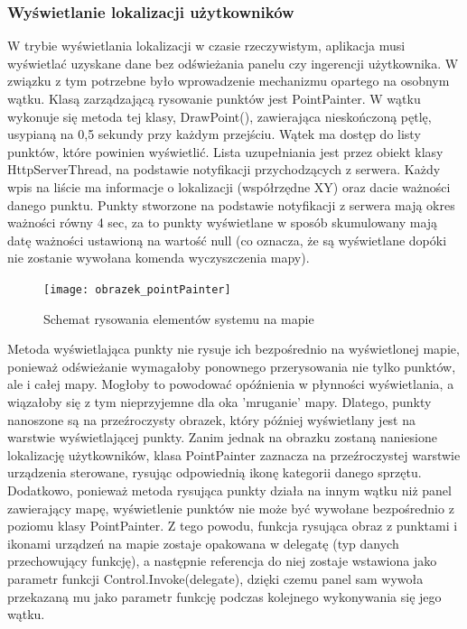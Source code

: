 \subsubsection{Wyświetlanie lokalizacji użytkowników} W trybie wyświetlania lokalizacji w czasie rzeczywistym, aplikacja musi wyświetlać uzyskane dane bez odświeżania panelu czy ingerencji użytkownika. W związku z tym potrzebne było wprowadzenie mechanizmu opartego na osobnym wątku. Klasą zarządzającą rysowanie punktów jest PointPainter. W wątku wykonuje się metoda tej klasy, DrawPoint(), zawierająca nieskończoną pętlę, usypianą na 0,5 sekundy przy każdym przejściu. Wątek ma dostęp do listy punktów, które powinien wyświetlić. Lista uzupełniania jest przez obiekt klasy HttpServerThread, na podstawie notyfikacji przychodzących z serwera. Każdy wpis na liście ma informacje o lokalizacji (współrzędne XY) oraz dacie ważności danego punktu. Punkty stworzone na podstawie notyfikacji z serwera mają okres ważności równy 4 sec, za to punkty wyświetlane w sposób skumulowany mają datę ważności ustawioną na wartość null (co oznacza, że są wyświetlane dopóki nie zostanie wywołana komenda wyczyszczenia mapy).
\begin{figure}[H]			
	\centering
	\caption{Schemat rysowania elementów systemu na mapie}
	\texttt{[image: obrazek\_pointPainter]}
\end{figure}
Metoda wyświetlająca punkty nie rysuje ich bezpośrednio na wyświetlonej mapie, ponieważ odświeżanie wymagałoby ponownego przerysowania nie tylko punktów, ale i całej mapy. Mogłoby to powodować opóźnienia w płynności wyświetlania, a wiązałoby się z tym nieprzyjemne dla oka 'mruganie' mapy. Dlatego, punkty nanoszone są na przeźroczysty obrazek, który później wyświetlany jest na warstwie wyświetlającej punkty. Zanim jednak na obrazku zostaną naniesione lokalizację użytkowników, klasa PointPainter zaznacza na przeźroczystej warstwie urządzenia sterowane, rysując odpowiednią ikonę kategorii danego sprzętu. Dodatkowo, ponieważ metoda rysująca punkty działa na innym wątku niż panel zawierający mapę, wyświetlenie punktów nie może być wywołane bezpośrednio z poziomu klasy PointPainter. Z tego powodu, funkcja rysująca obraz z punktami i ikonami urządzeń na mapie zostaje opakowana w delegatę (typ danych przechowujący funkcję), a następnie referencja do niej zostaje wstawiona jako parametr funkcji Control.Invoke(delegate), dzięki czemu panel sam wywoła przekazaną mu jako parametr funkcję podczas kolejnego wykonywania się jego wątku.